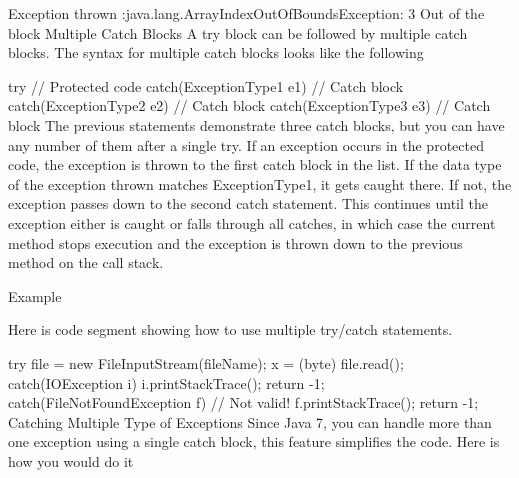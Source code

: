 Exception thrown  :java.lang.ArrayIndexOutOfBoundsException: 3
Out of the block
Multiple Catch Blocks
A try block can be followed by multiple catch blocks. The syntax for multiple catch blocks looks like the following

try {
   // Protected code
}catch(ExceptionType1 e1) {
   // Catch block
}catch(ExceptionType2 e2) {
   // Catch block
}catch(ExceptionType3 e3) {
   // Catch block
}
The previous statements demonstrate three catch blocks, but you can have any number of them after a single try. If an exception occurs in the protected code, the exception is thrown to the first catch block in the list. If the data type of the exception thrown matches ExceptionType1, it gets caught there. If not, the exception passes down to the second catch statement. This continues until the exception either is caught or falls through all catches, in which case the current method stops execution and the exception is thrown down to the previous method on the call stack.

Example

Here is code segment showing how to use multiple try/catch statements.

try {
   file = new FileInputStream(fileName);
   x = (byte) file.read();
}catch(IOException i) {
   i.printStackTrace();
   return -1;
}catch(FileNotFoundException f) // Not valid! {
   f.printStackTrace();
   return -1;
}
Catching Multiple Type of Exceptions
Since Java 7, you can handle more than one exception using a single catch block, this feature simplifies the code. Here is how you would do it


